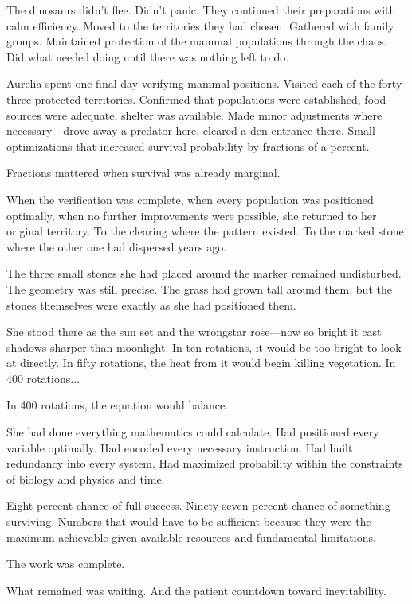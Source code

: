 The dinosaurs didn't flee. Didn't panic. They continued their preparations with calm efficiency. Moved to the territories they had chosen. Gathered with family groups. Maintained protection of the mammal populations through the chaos. Did what needed doing until there was nothing left to do.

Aurelia spent one final day verifying mammal positions. Visited each of the forty-three protected territories. Confirmed that populations were established, food sources were adequate, shelter was available. Made minor adjustments where necessary—drove away a predator here, cleared a den entrance there. Small optimizations that increased survival probability by fractions of a percent.

Fractions mattered when survival was already marginal.

When the verification was complete, when every population was positioned optimally, when no further improvements were possible, she returned to her original territory. To the clearing where the pattern existed. To the marked stone where the other one had dispersed years ago.

The three small stones she had placed around the marker remained undisturbed. The geometry was still precise. The grass had grown tall around them, but the stones themselves were exactly as she had positioned them.

She stood there as the sun set and the wrongstar rose—now so bright it cast shadows sharper than moonlight. In ten rotations, it would be too bright to look at directly. In fifty rotations, the heat from it would begin killing vegetation. In 400 rotations...

In 400 rotations, the equation would balance.

She had done everything mathematics could calculate. Had positioned every variable optimally. Had encoded every necessary instruction. Had built redundancy into every system. Had maximized probability within the constraints of biology and physics and time.

Eight percent chance of full success. Ninety-seven percent chance of something surviving. Numbers that would have to be sufficient because they were the maximum achievable given available resources and fundamental limitations.

The work was complete.

What remained was waiting. And the patient countdown toward inevitability.

\scenebreak

